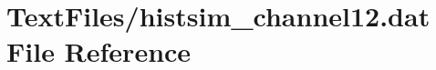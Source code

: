 \hypertarget{TextFiles_2histsim__channel12_8dat}{}\section{Text\+Files/histsim\+\_\+channel12.dat File Reference}
\label{TextFiles_2histsim__channel12_8dat}
